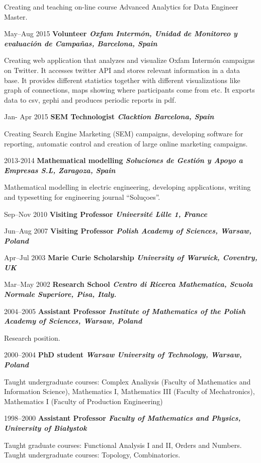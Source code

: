 \documentclass{article}
\begin{document}
\begin{CV}
  Creating and teaching on-line course Advanced Analytics for Data Engineer Master.


\item[May--Aug 2015] {\bf Volunteer \it Oxfam Intermón, Unidad de
    Monitoreo y evaluación de Campañas, Barcelona, Spain}

  Creating web application that analyzes and visualize Oxfam Intermón
  campaigns on Twitter. It accesses twitter API and stores relevant
  information in a data base. It provides different
  statistics together with different
  visualizations like graph of connections, maps showing
  where participants come from etc. It exports data to csv, gephi and
  produces periodic reports in pdf.  
  
\item[Jan- Apr 2015] {\bf SEM Technologist \it Clacktion
    Barcelona, Spain}

  Creating Search Engine Marketing (SEM) campaigns, developing
  software for reporting, automatic control and creation of large
  online marketing campaigns.
  

\item[2013-2014] {\bf Mathematical modelling \it Soluciones de Gestión y Apoyo a Empresas S.L,
    Zaragoza, Spain}

  Mathematical modelling in electric engineering, developing
  applications,  writing and typesetting for engineering journal
  ``Soluçoes''.


\item[Sep--Nov 2010] {\bf Visiting Professor \it Universit{\'e} Lille 1, France}
  
\item[Jun--Aug 2007] {\bf Visiting Professor \it Polish Academy of Sciences, Warsaw, Poland}

\item[Apr--Jul 2003] {\bf Marie Curie Scholarship \it University of Warwick, Coventry, UK}
    
\item[Mar--May 2002] {\bf Research School \it Centro di Ricerca Mathematica, Scuola Normale
    Superiore, Pisa, Italy.}


\item[2004--2005] {\bf Assistant Professor \it Institute of Mathematics of the Polish Academy of
    Sciences, Warsaw, Poland}

  Research position.
  
\item[2000--2004] {\bf PhD student \it Warsaw University of Technology, Warsaw, Poland}

  Taught undergraduate courses: Complex Analiysis (Faculty of
  Mathematics and Information Science), Mathematics I, Mathematics III
  (Faculty of Mechatronics), Mathematics I (Faculty of Production Engineering)

\item[1998--2000] {\bf Assistant Professor \it Faculty of Mathematics and Physics, University
    of Bia{\l}ystok}

  Taught graduate courses: Functional Analysis I and II, Orders and
  Numbers.  Taught undergraduate courses: Topology, Combinatorics.

\end{CV}
\end{document}
